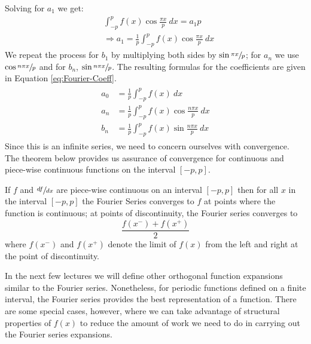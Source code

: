 Solving for $a_1$ we get:
\begin{align*}
&\int_{-p}^{p} f(x)\cos{\frac{\pi x}{p}} \ dx =a_1 p \\
& \Rightarrow a_1 = \frac{1}{p}\int_{-p}^{p} f(x)\cos{\frac{\pi x}{p}} \ dx
\end{align*}
We repeat the process for $b_1$ by multiplying both sides by $\sin{\sfrac{\pi x}{p}}$; for $a_n$ we use $\cos{\sfrac{n \pi x}{p}}$ and for $b_n$, $\sin{\sfrac{n \pi x}{p}}$.  The resulting formulas for the coefficients are given in Equation \ref{eq:Fourier-Coeff}.
\begin{align}
\begin{split}
a_0 &= \frac{1}{p}\int_{-p}^{p} f(x) \ dx \\
a_n &= \frac{1}{p}\int_{-p}^{p} f(x) \cos{\frac{n \pi x}{p}} \ dx \\
b_n &= \frac{1}{p}\int_{-p}^{p} f(x) \sin{\frac{n \pi x}{p}} \ dx 
\end{split}
\label{eq:Fourier-Coeff}
\end{align}
Since this is an infinite series, we need to concern ourselves with convergence.  The theorem below provides us assurance of convergence for continuous and piece-wise continuous functions on the interval $[-p,p]$.  
\begin{theorem}
If $f$ and $\sfrac{df}{dx}$ are piece-wise continuous on an interval $[-p,p]$ then for all $x$ in the interval $[-p,p]$ the Fourier Series converges to $f$ at points where the function is continuous; at points of discontinuity, the Fourier series converges to 
\begin{equation*}
\frac{f(x^{-}) + f(x^+)}{2}
\end{equation*}
where $f(x^-)$ and $f(x^+)$ denote the limit of $f(x)$ from the left and right at the point of discontinuity.
\end{theorem}
In the next few lectures we will define other orthogonal function expansions similar to the Fourier series.  Nonetheless, for periodic functions defined on a finite interval, the Fourier series provides the best representation of a function.  There are some special cases, however, where we can take advantage of structural properties of $f(x)$ to reduce the amount of work we need to do in carrying out the Fourier series expansions.

